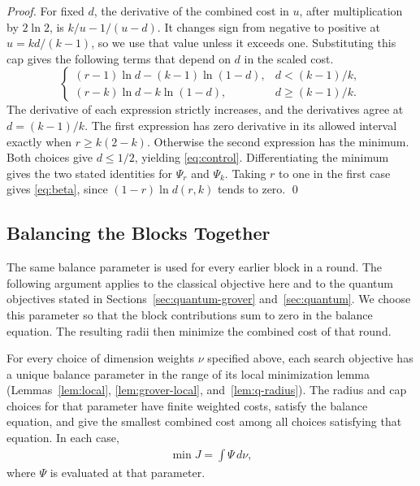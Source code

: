 \documentclass[runningheads,envcountsame,envcountsect,orivec]{llncs}
\begin{document}
\begin{proof}
For fixed $d$, the derivative of the combined cost in $u$, after
multiplication by $2\ln 2$, is $k/u-1/(u-d)$. It changes
sign from negative to positive at $u=kd/(k-1)$, so we use
that value unless it exceeds one. Substituting this cap gives
the following terms that depend on $d$ in the scaled cost.
\[
 \begin{cases}
  (r-1)\ln d-(k-1)\ln(1-d),&d<(k-1)/k,\\
  (r-k)\ln d-k\ln(1-d),&d\ge(k-1)/k .
 \end{cases}
\]
The derivative of each expression strictly increases, and the
derivatives agree at $d=(k-1)/k$. The first expression has
zero derivative in its allowed interval exactly when
$r\ge k(2-k)$. Otherwise the second expression has the
minimum. Both choices give $d\le1/2$, yielding
\eqref{eq:control}. Differentiating the minimum gives the two
stated identities for $\Psi_r$ and $\Psi_k$. Taking $r$ to one in the first case
gives \eqref{eq:beta}, since $(1-r)\ln d(r,k)$ tends to zero.
\qed
\end{proof}


\subsection{Balancing the Blocks Together}
\label{sec:separation-balance}

The same balance parameter is used for every earlier block in a
round. The following argument applies to the classical objective here
and to the quantum objectives stated in Sections~\ref{sec:quantum-grover}
and~\ref{sec:quantum}. We choose this parameter so that the block contributions
sum to zero in the balance equation. The resulting radii then
minimize the combined cost of that round.

\begin{lemma}
\label{lem:separation-attainment}
For every choice of dimension weights $\nu$ specified above,
each search objective has a unique balance parameter in the range
of its local minimization lemma
(Lemmas~\ref{lem:local}, \ref{lem:grover-local}, and~\ref{lem:q-radius}).
The radius and cap choices for that parameter have finite
weighted costs, satisfy the balance equation, and give the
smallest combined cost among all choices satisfying that equation. In each case,
\begin{align}
 \min J=\int\Psi\,d\nu,
 \label{eq:separation-attainment}
\end{align}
where $\Psi$ is evaluated at that parameter.
\end{lemma}
\end{document}
